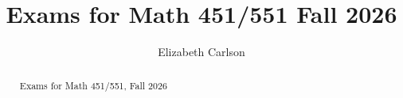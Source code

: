 \documentclass{xourse}
\author{ Elizabeth Carlson }
\title{Exams for Math 451/551 Fall 2026}
\begin{document}
\begin{abstract}
Exams for Math 451/551, Fall 2026
 \end{abstract}
\maketitle

\end{document}
